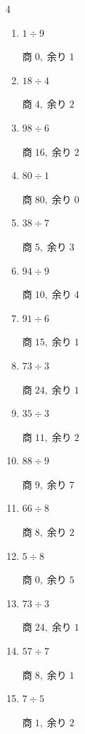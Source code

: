 \begin{multicols}{4}
\begin{enumerate}
  \item $1 \div 9$

        $商\; 0,\; 余り\; 1$

  \item $18 \div 4$

        $商\; 4,\; 余り\; 2$

  \item $98 \div 6$

        $商\; 16,\; 余り\; 2$

\columnbreak %

  \item $80 \div 1$

        $商\; 80,\; 余り\; 0$

  \item $38 \div 7$

        $商\; 5,\; 余り\; 3$

  \item $94 \div 9$

        $商\; 10,\; 余り\; 4$

  \item $91 \div 6$

        $商\; 15,\; 余り\; 1$

  \item $73 \div 3$

        $商\; 24,\; 余り\; 1$

  \item $35 \div 3$

        $商\; 11,\; 余り\; 2$

  \item $88 \div 9$

        $商\; 9,\; 余り\; 7$

  \item $66 \div 8$

        $商\; 8,\; 余り\; 2$

  \item $5 \div 8$

        $商\; 0,\; 余り\; 5$

  \item $73 \div 3$

        $商\; 24,\; 余り\; 1$

  \item $57 \div 7$

        $商\; 8,\; 余り\; 1$

  \item $7 \div 5$

        $商\; 1,\; 余り\; 2$


\end{enumerate}
\end{multicols}
